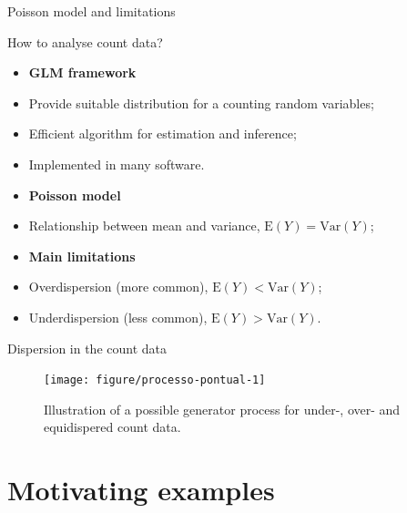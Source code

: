 \documentclass[11pt]{beamer}\usepackage[]{graphicx}\usepackage[]{color}
\newenvironment{knitrout}{}{} %
\begin{document}
\begin{frame}{Poisson model and limitations}

  How to analyse count data?

  \begin{itemize}
    \item[] {\bf GLM framework \citep{Nelder1972}}
    \item Provide suitable distribution for a counting random variables;
    \item Efficient algorithm for estimation and inference;
    \item Implemented in many software.
      \vspace{0.3cm}
    \item[] {\bf Poisson model}
    \item Relationship between mean and variance,
      $\text{E}(Y)=\text{Var}(Y)$;
      \vspace{0.3cm}
    \item[] {\bf Main limitations}
    \item Overdispersion (more common), $\text{E}(Y)<\text{Var}(Y)$;
    \item Underdispersion (less common), $\text{E}(Y)>\text{Var}(Y)$.
  \end{itemize}

\end{frame}

\begin{frame}{Dispersion in the count data}

\begin{knitrout}
\color{fgcolor}\begin{figure}[!htb]

{\centering \texttt{[image: figure/processo-pontual-1]} 

}

\caption[Illustration of a possible generator process for under-, over- and equidispered count data]{Illustration of a possible generator process for under-, over- and equidispered count data.}\label{fig:processo-pontual}
\end{figure}


\end{knitrout}

\end{frame}

\section{Motivating examples}
\end{document}
